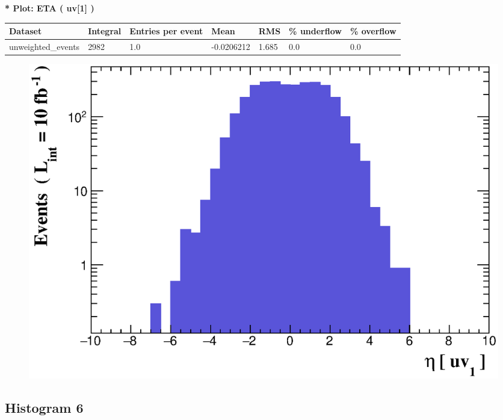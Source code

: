 \documentclass[a4paper, 10pt]{article}
\begin{document}
\textbf{* Plot: ETA ( uv[1] ) }\\
   \begin{table}[H]
  \begin{center}
    \begin{tabular}{|m{23.0mm}|m{23.0mm}|m{18.0mm}|m{19.0mm}|m{19.0mm}|m{19.0mm}|m{19.0mm}|}
      \hline
      {\cellcolor{yellow}         Dataset}& {\cellcolor{yellow}         Integral}& {\cellcolor{yellow}         Entries per event}& {\cellcolor{yellow}         Mean}& {\cellcolor{yellow}         RMS}& {\cellcolor{yellow}         \% underflow}& {\cellcolor{yellow}         \% overflow}\\
      \hline
      {\cellcolor{white}         unweighted\_events}& {\cellcolor{white}         2982}& {\cellcolor{white}         1.0}& {\cellcolor{white}         -0.0206212}& {\cellcolor{white}         1.685}& {\cellcolor{green}         0.0}& {\cellcolor{green}         0.0}\\
\hline
    \end{tabular}
  \end{center}
\end{table}

\begin{figure}[H]
  \begin{center}
    \includegraphics[scale=0.45]{selection_4.eps}\\
\caption{   }
  \end{center}
\end{figure}
      \newpage
\subsection{ Histogram 6}
\end{document}
